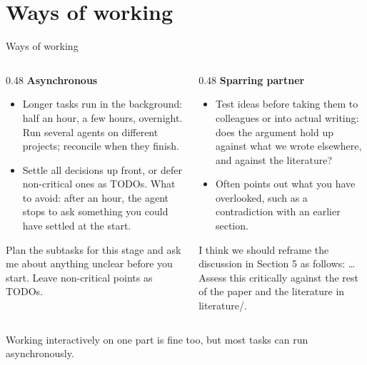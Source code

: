 \documentclass[aspectratio=169,11pt]{beamer}
\newcommand{\prompt}[1]{\begin{promptbox}\textcolor{accent}{\faCommentDots}\enspace #1\end{promptbox}}
\newcommand{\icon}[1]{\textcolor{accent}{#1}}
\begin{document}
\section{Ways of working}

\begin{frame}{Ways of working}
  \begin{columns}[T]
    \begin{column}{0.48\textwidth}
      \icon{\faClock}\enspace\textbf{Asynchronous}
      \begin{itemize}\small
        \item Longer tasks run in the background: half an hour, a few hours, overnight. Run several agents on different projects; reconcile when they finish.
        \item Settle all decisions up front, or defer non-critical ones as TODOs. What to avoid: after an hour, the agent stops to ask something you could have settled at the start.
      \end{itemize}
      \prompt{Plan the subtasks for this stage and ask me about anything unclear before you start. Leave non-critical points as TODOs.}
    \end{column}
    \begin{column}{0.48\textwidth}
      \icon{\faComments}\enspace\textbf{Sparring partner}
      \begin{itemize}\small
        \item Test ideas before taking them to colleagues or into actual writing: does the argument hold up against what we wrote elsewhere, and against the literature?
        \item Often points out what you have overlooked, such as a contradiction with an earlier section.
      \end{itemize}
      \prompt{I think we should reframe the discussion in Section 5 as follows: \dots{} Assess this critically against the rest of the paper and the literature in literature/.}
    \end{column}
  \end{columns}
  \vspace{0.2em}
  {\small Working interactively on one part is fine too, but most tasks can run asynchronously.}
\end{frame}
\end{document}
